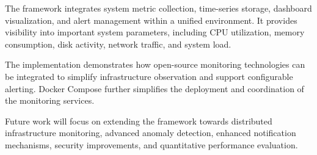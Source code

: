 \documentclass[conference]{IEEEtran}
\begin{document}
The framework integrates system metric collection,
time-series storage, dashboard visualization, and
alert management within a unified environment.
It provides visibility into important system parameters,
including CPU utilization, memory consumption, disk
activity, network traffic, and system load.

The implementation demonstrates how open-source
monitoring technologies can be integrated to simplify
infrastructure observation and support configurable
alerting. Docker Compose further simplifies the
deployment and coordination of the monitoring services.

Future work will focus on extending the framework
towards distributed infrastructure monitoring,
advanced anomaly detection, enhanced notification
mechanisms, security improvements, and quantitative
performance evaluation.

\end{document}

